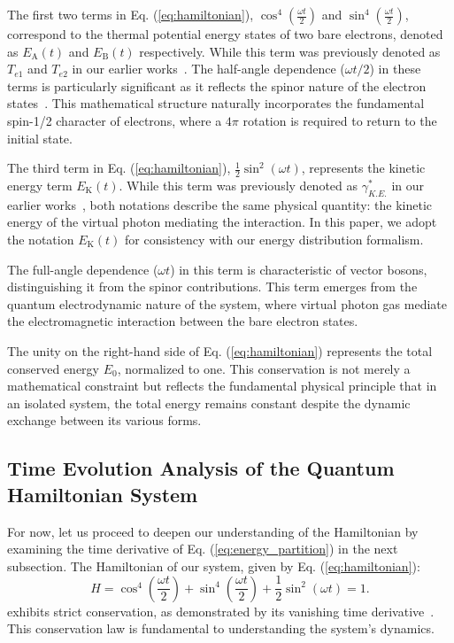 \documentclass[%
 reprint,
 amsmath,amssymb,
 aps,
]{revtex4-1}
\numberwithin{equation}{section}%
\begin{document}
The first two terms in Eq. (\ref{eq:hamiltonian}), $\cos^4\left(\frac{\omega t}{2}\right)$ and $\sin^4\left(\frac{\omega t}{2}\right)$, correspond to the thermal potential energy states of two bare electrons, denoted as $E_{\mathrm{A}}(t)$ and $E_{\mathrm{B}}(t)$ respectively. While this term was previously denoted as $T_{e1}$ and $T_{e2}$ in our earlier works~\cite{hanamura2018, hanamura2020, hanamura2023}. The half-angle dependence ($\omega t/2$) in these terms is particularly significant as it reflects the spinor nature of the electron states~\cite{dirac1928}. This mathematical structure naturally incorporates the fundamental spin-1/2 character of electrons, where a $4\pi$ rotation is required to return to the initial state.

The third term in Eq. (\ref{eq:hamiltonian}), $\frac{1}{2}\sin^2\left(\omega t\right)$, represents the kinetic energy term $E_{\mathrm{K}}(t)$. While this term was previously denoted as $\gamma^*_{K.E.}$ in our earlier works~\cite{hanamura2018, hanamura2020, hanamura2023}, both notations describe the same physical quantity: the kinetic energy of the virtual photon mediating the interaction. In this paper, we adopt the notation $E_{\mathrm{K}}(t)$ for consistency with our energy distribution formalism.

The full-angle dependence ($\omega t$) in this term is characteristic of vector bosons, distinguishing it from the spinor contributions. This term emerges from the quantum electrodynamic nature of the system, where virtual photon gas mediate the electromagnetic interaction between the bare electron states.

The unity on the right-hand side of Eq. (\ref{eq:hamiltonian}) represents the total conserved energy $E_0$, normalized to one. This conservation is not merely a mathematical constraint but reflects the fundamental physical principle that in an isolated system, the total energy remains constant despite the dynamic exchange between its various forms.


\subsection{\label{sec:Time Evolution Analysis}Time Evolution Analysis of the Quantum Hamiltonian System}

For now, let us proceed to deepen our understanding of the Hamiltonian by examining the time derivative of Eq. (\ref{eq:energy_partition}) in the next subsection.
The Hamiltonian of our system, given by Eq. (\ref{eq:hamiltonian}):
\begin{equation}
    H = \cos^4\left(\frac{\omega t}{2}\right) + \sin^4\left(\frac{\omega t}{2}\right) + \frac{1}{2}\sin^2(\omega t) = 1.
\end{equation}
exhibits strict conservation, as demonstrated by its vanishing time derivative~\cite{hanamura2023}. This conservation law is fundamental to understanding the system's dynamics.
\end{document}
